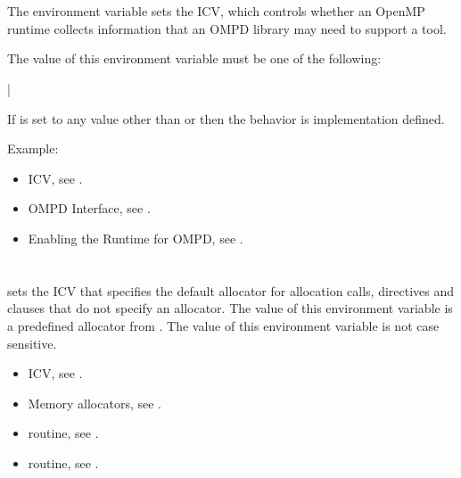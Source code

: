 \section{}
\label{sec:OMP_DEBUG}

The  environment variable sets the  ICV, 
which controls whether an OpenMP runtime collects information that an 
OMPD library may need to support a tool.

The value of this environment variable must be one of the following:

{|}

If  is set to any value other than 
or  then the behavior is implementation defined.

Example:
\begin{ompEnv}
\end{ompEnv}

\crossreferences
\begin{itemize}
\item {} ICV,
see .

\item OMPD Interface, see .

\item Enabling the Runtime for OMPD, see .
\end{itemize}



\section{}
\label{sec:OMP_ALLOCATOR}

 sets the  ICV that specifies 
the default allocator for allocation calls, directives and clauses that 
do not specify an allocator. The value of this environment variable is a 
predefined allocator from . The value 
of this environment variable is not case sensitive.

\crossreferences
\begin{itemize}
\item {} ICV, see .

\item Memory allocators, see .

\item {} routine, 
see .

\item {} routine, 
see .
\end{itemize}
